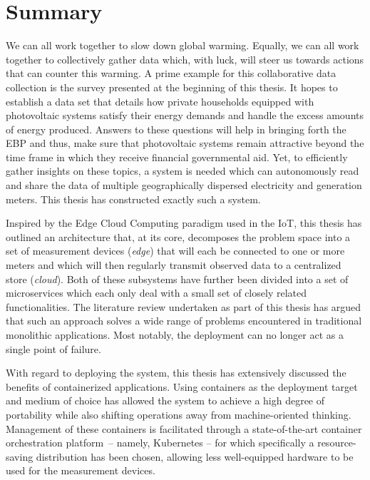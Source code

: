 
\chapter{Summary}
\label{chp:summary}

We can all work together to slow down global warming. Equally, we can all work together to collectively gather data which, with luck, will steer us towards actions that can counter this warming. A prime example for this collaborative data collection is the survey presented at the beginning of this thesis. It hopes to establish a data set that details how private households equipped with photovoltaic systems satisfy their energy demands and handle the excess amounts of energy produced. Answers to these questions will help in bringing forth the \acl{EBP} and thus, make sure that photovoltaic systems remain attractive beyond the time frame in which they receive financial governmental aid. Yet, to efficiently gather insights on these topics, a system is needed which can autonomously read and share the data of multiple geographically dispersed electricity and generation meters. This thesis has constructed exactly such a system.

Inspired by the Edge Cloud Computing paradigm used in the \acl{IoT}, this thesis has outlined an architecture that, at its core, decomposes the problem space into a set of measurement devices (\textit{edge}) that will each be connected to one or more meters and which will then regularly transmit observed data to a centralized store (\textit{cloud}). Both of these subsystems have further been divided into a set of microservices which each only deal with a small set of closely related functionalities. The literature review undertaken as part of this thesis has argued that such an approach solves a wide range of problems encountered in traditional monolithic applications. Most notably, the deployment can no longer act as a single point of failure.

With regard to deploying the system, this thesis has extensively discussed the benefits of containerized applications. Using containers as the deployment target and medium of choice has allowed the system to achieve a high degree of portability while also shifting operations away from machine-oriented thinking. Management of these containers is facilitated through a state-of-the-art container orchestration platform~-- namely, Kubernetes -- for which specifically a resource-saving distribution has been chosen, allowing less well-equipped hardware to be used for the measurement devices. 

